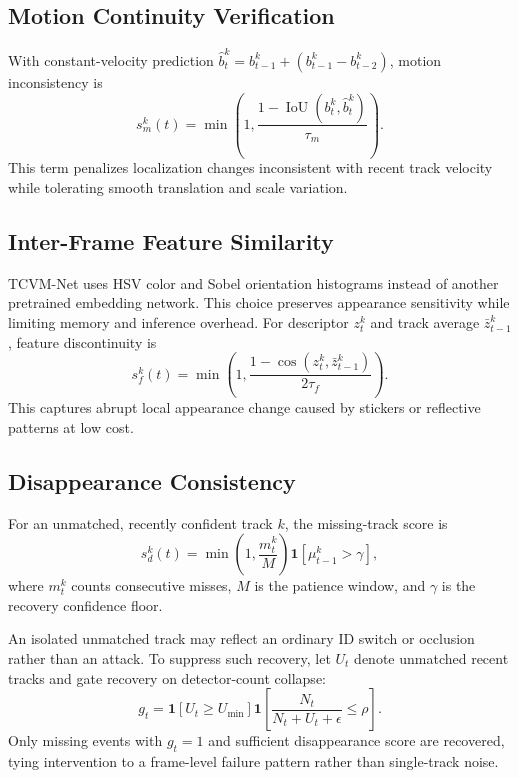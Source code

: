 \documentclass[runningheads,a4paper]{llncs}
\newcommand{\method}{TCVM-Net}
\begin{document}
\subsection{Motion Continuity Verification}
With constant-velocity prediction $\hat{b}_t^k=b_{t-1}^k+(b_{t-1}^k-b_{t-2}^k)$, motion inconsistency is
\begin{equation}
s_m^k(t)=\min\left(1,\frac{1-\operatorname{IoU}(b_t^k,\hat{b}_t^k)}{\tau_m}\right).
\end{equation}
This term penalizes localization changes inconsistent with recent track velocity while tolerating smooth translation and scale variation.

\subsection{Inter-Frame Feature Similarity}
\method{} uses HSV color and Sobel orientation histograms instead of another pretrained embedding network. This choice preserves appearance sensitivity while limiting memory and inference overhead. For descriptor $z_t^k$ and track average $\bar{z}_{t-1}^k$, feature discontinuity is
\begin{equation}
s_f^k(t)=
\min\left(1,\frac{1-\cos(z_t^k,\bar{z}_{t-1}^k)}{2\tau_f}\right).
\end{equation}
This captures abrupt local appearance change caused by stickers or reflective patterns at low cost.

\subsection{Disappearance Consistency}
For an unmatched, recently confident track $k$, the missing-track score is
\begin{equation}
s_d^k(t)=
\min\left(1,\frac{m_t^k}{M}\right)\mathbf{1}[\mu_{t-1}^k>\gamma],
\end{equation}
where $m_t^k$ counts consecutive misses, $M$ is the patience window, and $\gamma$ is the recovery confidence floor.

An isolated unmatched track may reflect an ordinary ID switch or occlusion rather than an attack. To suppress such recovery, let $U_t$ denote unmatched recent tracks and gate recovery on detector-count collapse:
\begin{equation}
g_t=\mathbf{1}\left[U_t\geq U_{\min}\right]
\mathbf{1}\left[\frac{N_t}{N_t+U_t+\epsilon}\leq\rho\right].
\end{equation}
Only missing events with $g_t=1$ and sufficient disappearance score are recovered, tying intervention to a frame-level failure pattern rather than single-track noise.
\end{document}
